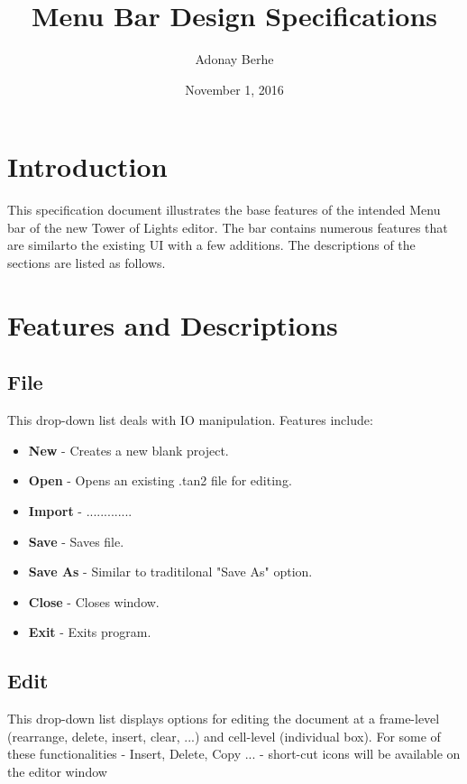 \documentclass[preprint,12pt]{article}
\title{\textbf {Menu Bar Design Specifications}}
\author{Adonay Berhe}
\date{November 1, 2016}
\begin{document}
\maketitle

\section*{Introduction}

{This specification document illustrates the base features of the intended Menu bar of the new Tower of Lights editor. The bar contains numerous features that are similarto the existing UI with a few additions. The descriptions of the sections are listed as follows.}

\section*{Features and Descriptions}

\subsection*{File}

{This drop-down list deals with IO manipulation. Features include:}

\begin{itemize}
\item \textbf{New} - Creates a new blank project. 
\item \textbf{Open} - Opens an existing .tan2 file for editing.
\item \textbf{Import} - .............
\item \textbf{Save} - Saves file.
\item \textbf{Save As} - Similar to traditilonal "Save As" option.
\item \textbf{Close} - Closes window. 
\item \textbf{Exit} - Exits program.

\end{itemize}

\subsection*{Edit}

{This drop-down list displays options for editing the document at a frame-level (rearrange, delete, insert, clear, ...) and cell-level (individual box). For some of these functionalities - Insert, Delete, Copy ... - short-cut icons will be available on the editor window}
\end{document}
